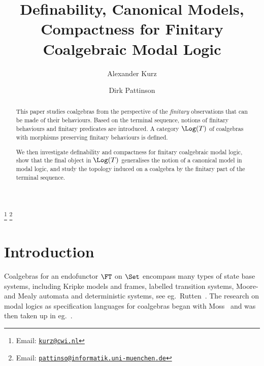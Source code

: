 \documentclass{entcs}
\begin{document}
\begin{frontmatter}
  \title{Definability, Canonical Models, Compactness for
    Finitary Coalgebraic Modal Logic}%
  \author{Alexander Kurz}%
  \address{CWI\\ P.O.  Box 94079, 1090 GB Amsterdam\\ The Netherlands}%
  \author{Dirk Pattinson}%
  \address{Ludwig-Maximilians-Universit{\"a}t M{\"u}nchen\\
    Oettingenstr.~67, 80538 M{\"u}nchen\\ Germany}%
  \thanks[myemail]{Email: \href{mailto:kurz@cwi.nl}
    {\texttt{\normalshape kurz@cwi.nl}}}%
  \thanks[coemail]{Email:
    \href{mailto:pattinso@informatik.uni-muenchen.de}
    {\texttt{\normalshape pattinso@informatik.uni-muenchen.de}}}%
  \begin{abstract}
    This paper studies coalgebras %
    from the perspective of the \emph{finitary} observations that can
    be made of their behaviours.
    Based on the %
    terminal sequence, notions of
    finitary behaviours and finitary predicates are introduced. A
    category $\Log(T)$ of coalgebras with morphisms preserving
    finitary behaviours is defined.
    
    We then investigate definability and compactness for finitary
    coalgebraic modal logic, show that the final object in $\Log(T)$
    generalises the notion of a canonical model in modal logic, and
    study the topology induced on a coalgebra by the finitary part of
    the terminal sequence.
  \end{abstract}
\end{frontmatter}



\section*{Introduction}

Coalgebras for an endofunctor $\FT$ on $\Set$ encompass many types of
state base systems, including Kripke models and frames, labelled
transition systems, Moore- and Mealy automata and deterministic
systems, see eg.\ Rutten~\cite{rutten:uc-j}. The research on modal
logics as specification languages for coalgebras began with
Moss~\cite{moss:cl} and was then taken up in eg.\ 
\cite{kurz:cmcs98-j,roessiger:cmcs98-j,roessiger:cmcs00,jacobs:tl,jacobs:many-sorted}.
\end{document}
